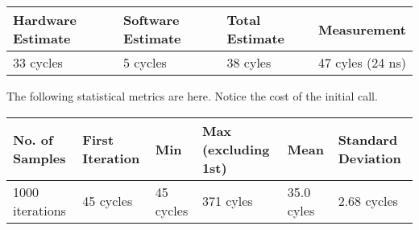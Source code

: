 \documentclass[paper=a4, fontsize=11pt]{scrartcl}
\numberwithin{equation}{section}        %
\numberwithin{figure}{section}          %
\numberwithin{table}{section}               %
\begin{document}
\begin{center}
    \begin{tabular}{ | l | l | l | p{5cm} |}
    \hline
    Hardware Estimate & Software Estimate & Total Estimate & Measurement \\ \hline
    33 cycles & 5 cycles & 38 cyles & 47 cyles (24 ns) \\ 
    \hline
    \end{tabular}
\end{center}

The following statistical metrics are here.  Notice the cost of the initial call.

\begin{center}
    \begin{tabular}{ | l | l | l | l | l | l |}
    \hline
    No. of Samples & First Iteration & Min & Max (excluding 1st) & Mean & Standard Deviation \\ \hline
    1000 iterations & 45 cycles & 45 cycles & 371 cyles & 35.0 cyles & 2.68 cycles \\ 
    \hline
    \end{tabular}
\end{center}







\end{document}

